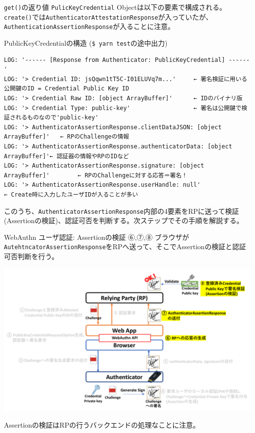 \documentclass[12pt,dvipdfmx,uplatex]{beamer}
\begin{document}
\begin{frame}[fragile]
\small

\texttt{get()}の返り値 \texttt{PulicKeyCredential} Objectは以下の要素で構成される。\texttt{create()}では\texttt{AuthenticatorAttestationResponse}が入っていたが、\alert{\texttt{AuthenticationAssertionResponse}が入ることに注意。}

\begin{exampleblock}{\footnotesize PublicKeyCredentialの構造 (\texttt{\$ yarn test}の途中出力)}
\tiny
\begin{verbatim}
LOG: '------ [Response from Authenticator: PublicKeyCredential] ------'
LOG: '> Credential ID: jsQqwn1tT5C-I01ELUVq7m...'     ← 署名検証に用いる公開鍵のID = Credential Public Key ID
LOG: '> Credential Raw ID: [object ArrayBuffer]'      ← IDのバイナリ版
LOG: '> Credential Type: public-key'                  ← 署名は公開鍵で検証されるものなので'public-key'
LOG: '> AuthenticatorAssertionResponse.clientDataJSON: [object ArrayBuffer]'   ← RPのChallengeの情報
LOG: '> AuthenticatorAssertionResponse.authenticatorData: [object ArrayBuffer]'← 認証器の情報やRPのIDなど
LOG: '> AuthenticatorAssertionResponse.signature: [object ArrayBuffer]'        ← RPのChallengeに対する応答＝署名！
LOG: '> AuthenticatorAssertionResponse.userHandle: null'                       ← Create時に入力したユーザIDが入ることが多い
\end{verbatim}
\end{exampleblock}

このうち、\texttt{AuthenticatorAssertionResponse}内部の4要素をRPに送って検証 (Assertionの検証)、認証可否を判断する。次ステップでその手順を解説する。
\end{frame}



\begin{frame}{WebAuthn ユーザ認証: Assertionの検証}
\small
⑥,⑦,⑧ ブラウザが\texttt{AutehtncatorAssertionResponse}をRPへ送って、そこでAssertionの検証と認証可否判断を行う。
\begin{center}
\includegraphics[width=0.9\linewidth]{Figs/webauthn-authentication4.pdf}
\end{center}
\alert{Assertionの検証はRPの行うバックエンドの処理なことに注意。}
\end{frame}
\end{document}
